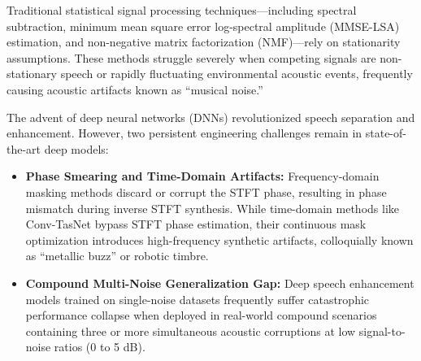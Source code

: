 \documentclass[11pt,a4paper]{report}
\begin{document}
Traditional statistical signal processing techniques---including spectral subtraction, minimum mean square error log-spectral amplitude (MMSE-LSA) estimation, and non-negative matrix factorization (NMF)---rely on stationarity assumptions. These methods struggle severely when competing signals are non-stationary speech or rapidly fluctuating environmental acoustic events, frequently causing acoustic artifacts known as ``musical noise.''

The advent of deep neural networks (DNNs) revolutionized speech separation and enhancement. However, two persistent engineering challenges remain in state-of-the-art deep models:
\begin{itemize}
    \item \textbf{Phase Smearing and Time-Domain Artifacts:} Frequency-domain masking methods discard or corrupt the STFT phase, resulting in phase mismatch during inverse STFT synthesis. While time-domain methods like Conv-TasNet bypass STFT phase estimation, their continuous mask optimization introduces high-frequency synthetic artifacts, colloquially known as ``metallic buzz'' or robotic timbre.
    \item \textbf{Compound Multi-Noise Generalization Gap:} Deep speech enhancement models trained on single-noise datasets frequently suffer catastrophic performance collapse when deployed in real-world compound scenarios containing three or more simultaneous acoustic corruptions at low signal-to-noise ratios (0 to 5 dB).
\end{itemize}
\end{document}
